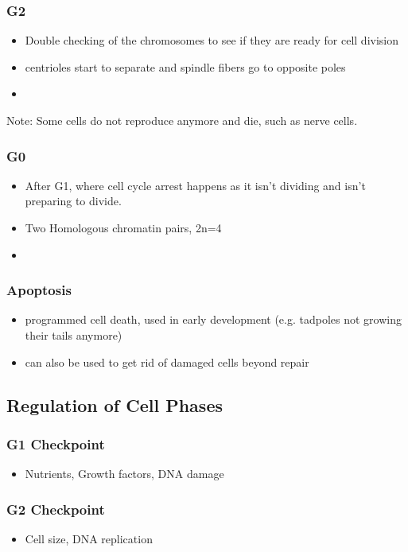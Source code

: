 \documentclass{article}
\begin{document}
\subsubsection*{G2}
\begin{itemize}
    \item Double checking of the chromosomes to see if they are ready for cell division
    \item centrioles start to separate and spindle fibers go to opposite poles
    \item 
\end{itemize}
Note: Some cells do not reproduce anymore and die, such as nerve cells.
\subsubsection*{G0}
\begin{itemize}
    \item After G1, where cell cycle arrest happens as it isn't dividing and isn't preparing to divide.
    \item Two Homologous chromatin pairs, 2n=4
    \item 
\end{itemize}
\subsubsection*{Apoptosis}
\begin{itemize}
    \item programmed cell death, used in early development (e.g. tadpoles not growing their tails anymore)
    \item can also be used to get rid of damaged cells beyond repair
\end{itemize}
\subsection*{Regulation of Cell Phases}
\subsubsection*{G1 Checkpoint}
\begin{itemize}
    \item Nutrients, Growth factors, DNA damage
\end{itemize}
\subsubsection*{G2  Checkpoint}
\begin{itemize}
    \item Cell size, DNA replication
\end{itemize}
\end{document}
